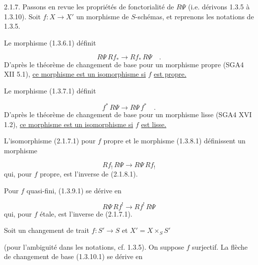 2.1.7. Passons en revue les propriétés de fonctorialité de $R\Psi$ (i.e. dérivons 1.3.5 à 1.3.10). Soit $f : X \longrightarrow X'$ un morphisme de $S$-schémas, et reprenons les notations de 1.3.5.

Le morphisme (1.3.6.1) définit

\begin{equation}\tag{2.1.7.1}
R\Psi\, Rf_* \longrightarrow Rf_*\, R\Psi \quad .
\end{equation}
D'après le théorème de changement de base pour un morphisme propre (SGA4 XII 5.1), \underline{ce morphisme est un isomorphisme si} $f$ \underline{est propre.}

Le morphisme (1.3.7.1) définit

\begin{equation}\tag{2.1.7.2}
f^*\, R\Psi \longrightarrow R\Psi\, f^* \quad .
\end{equation}
D'après le théorème de changement de base pour un morphisme lisse (SGA4 XVI 1.2), \underline{ce morphisme est un isomorphisme si} $f$ \underline{est lisse.}

L'isomorphisme (2.1.7.1) pour $f$ propre et le morphisme (1.3.8.1)
définissent un morphisme

\begin{equation}\tag{2.1.7.3}
Rf_! \, R\Psi \longrightarrow R\Psi \, Rf_!
\end{equation}
qui, pour $f$ propre, est l'inverse de (2.1.8.1).

Pour $f$ quasi-fini, (1.3.9.1) se dérive en

\begin{equation}\tag{2.1.7.4}
R\Psi \, Rf^! \longrightarrow Rf^! \, R\Psi
\end{equation}
qui, pour $f$ étale, est l'inverse de (2.1.7.1).

Soit un changement de trait $f : S' \longrightarrow S$ et $X' = X \times_S S'$

\begin{center}
\end{center}
(pour l'ambiguité dans les notations, cf. 1.3.5). On suppose $f$ surjectif. La flèche de changement de base (1.3.10.1) se dérive en


